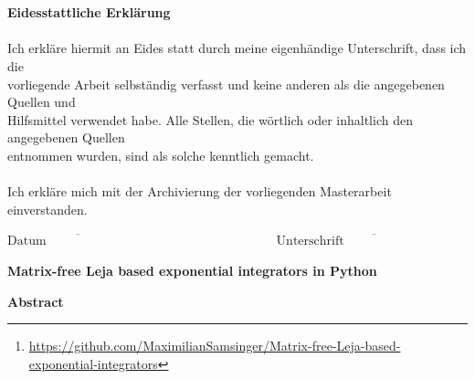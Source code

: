 \documentclass{scrartcl}
\begin{document}
{\begin{figure}[!htp]
\begin{flushright}
		\end{flushright}
	\end{figure}\\\\
	{\Large\textbf{Eidesstattliche Erklärung}}\\\\
	Ich erkläre hiermit an Eides statt durch meine eigenhändige Unterschrift, dass ich die\\ vorliegende Arbeit selbständig verfasst und keine anderen als die angegebenen Quellen und\\ Hilfsmittel verwendet habe. Alle Stellen, die wörtlich oder inhaltlich den angegebenen Quellen \\entnommen wurden, sind als solche kenntlich gemacht.\\\\
	Ich erkläre mich mit der Archivierung der vorliegenden Masterarbeit einverstanden.
	\vspace{40pt}\\
	\begin{center}
		\ensuremath{\overline{\mbox{Datum}\hspace{8em}}
			\hspace{10em}
			\overline{\mbox{Unterschrift}\hspace{10em}}
		}
		\thispagestyle{empty}
\end{center}}
\pagebreak
	
\begin{center}\textbf{\Huge Matrix-free Leja based exponential integrators in Python}\end{center}
\begin{center}\textbf{Abstract}\end{center}
\begin{abstract}
	In this master thesis we develop an algorithm to approximate the action of a matrix exponential function. In particular, we consider the case where the matrix is itself not available, but only its action as a linear operator. The construction is achieved by using a modified version of the real Leja method. We choose optimal interpolation parameters based on a spectral radius estimate computed by the power method. With this procedure we construct exponential Rosenbrock-type integrators to solve stiff advection-diffusion-reaction equations. We compare the performance of these integrators with other matrix-free differential equation solvers. 
	As part of this thesis we publish the code for the matrix-free Leja method for the action of the matrix exponential function on GitHub. \footnote{\url{https://github.com/MaximilianSamsinger/Matrix-free-Leja-based-exponential-integrators}}
\end{abstract}
\setcounter{page}{1}
	
\end{document}
